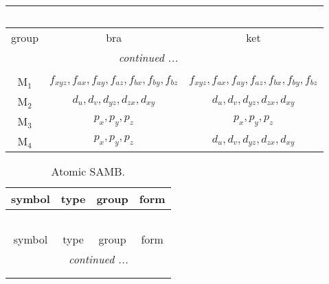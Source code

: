 \documentclass[fleqn,10pt,landscape]{article}
\begin{document}
\begin{itemize}
\begin{center}
\begin{longtable}{c|c|c}
\multicolumn{2}{l}{\tablename\ \thetable{}} \\
 \hline \hline
group & bra & ket \\ \hline \endhead

 \hline \hline
\multicolumn{2}{r}{\footnotesize\it continued ...} \\ \endfoot

 \hline \hline
\multicolumn{2}{r}{} \\ \endlastfoot

M$_{1}$ & $f_{xyz}, f_{ax}, f_{ay}, f_{az}, f_{bx}, f_{by}, f_{bz}$ & $f_{xyz}, f_{ax}, f_{ay}, f_{az}, f_{bx}, f_{by}, f_{bz}$ \\
M$_{2}$ & $d_{u}, d_{v}, d_{yz}, d_{zx}, d_{xy}$ & $d_{u}, d_{v}, d_{yz}, d_{zx}, d_{xy}$ \\
M$_{3}$ & $p_{x}, p_{y}, p_{z}$ & $p_{x}, p_{y}, p_{z}$ \\
M$_{4}$ & $p_{x}, p_{y}, p_{z}$ & $d_{u}, d_{v}, d_{yz}, d_{zx}, d_{xy}$ \\
\end{longtable}
\end{center}
\begin{center}
\renewcommand{\arraystretch}{1.3}
\begin{longtable}{c|c|c|c}
\caption{Atomic SAMB.}
 \\
 \hline \hline
symbol & type & group & form \\ \hline \endfirsthead

\multicolumn{3}{l}{\tablename\ \thetable{}} \\
 \hline \hline
symbol & type & group & form \\ \hline \endhead

 \hline \hline
\multicolumn{3}{r}{\footnotesize\it continued ...} \\ \endfoot

 \hline \hline
\multicolumn{3}{r}{} \\ \endlastfoot


\end{longtable}
\end{center}
\end{itemize}
\end{document}
